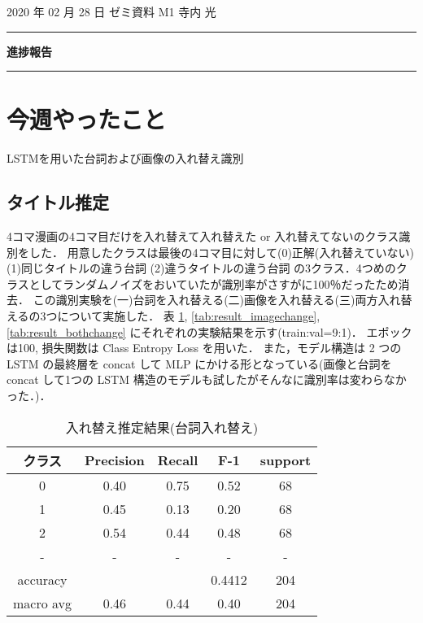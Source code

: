 \documentclass[onecolumn]{ujarticle}   %
\begin{document}
	\noindent

	\hspace{1em}
	2020 年 02 月 28 日
	ゼミ資料
	\hfill
	M1 寺内 光

	\vspace{2mm}

	\hrule

	\begin{center}
		{\Large \bf 進捗報告}
	\end{center}


	\hrule
	\vspace{3mm}

	\section{今週やったこと}
	\begin{itemize}{
		\item{LSTMを用いた台詞および画像の入れ替え識別}
	}
	\end{itemize}

	\subsection{タイトル推定}
	4コマ漫画の4コマ目だけを入れ替えて入れ替えた or 入れ替えてないのクラス識別をした．
	用意したクラスは最後の4コマ目に対して(0)正解(入れ替えていない) (1)同じタイトルの違う台詞 (2)違うタイトルの違う台詞
	の3クラス．4つめのクラスとしてランダムノイズをおいていたが識別率がさすがに100％だったため消去．
	この識別実験を(一)台詞を入れ替える(二)画像を入れ替える(三)両方入れ替えるの3つについて実施した．
	表 \ref{tab:result_serifchange}, \ref{tab:result_imagechange}, \ref{tab:result_bothchange} にそれぞれの実験結果を示す(train:val=9:1)．
	エポックは100, 損失関数は Class Entropy Loss を用いた．
	また，モデル構造は 2 つの LSTM の最終層を concat して MLP にかける形となっている(画像と台詞を concat して1つの LSTM 構造のモデルも試したがそんなに識別率は変わらなかった．)．

	\begin{table}[h]
		\vspace{-3mm}
		\centering
		\caption{入れ替え推定結果(台詞入れ替え)}
		\label{tab:result_serifchange}
		\begin{tabular}{|c|c|c|c|c|} \hline
			クラス&Precision&Recall&F-1&support\\ \hline\hline
			0&0.40&0.75&0.52&68\\ \hline
			1&0.45&0.13&0.20&68\\ \hline
			2&0.54&0.44&0.48&68\\ \hline
			-&-&-&-&-\\ \hline
			accuracy&&&0.4412&204\\ \hline
			macro avg&0.46&0.44&0.40&204\\ \hline
		\end{tabular}
	\end{table}
\end{document}
